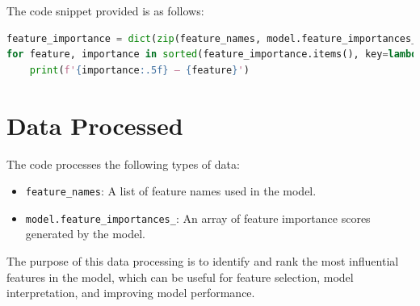\documentclass[12pt]{article}
\begin{document}
The code snippet provided is as follows:

\begin{lstlisting}[language=Python]
feature_importance = dict(zip(feature_names, model.feature_importances_))
for feature, importance in sorted(feature_importance.items(), key=lambda x: x[1], reverse=True):
    print(f'{importance:.5f} — {feature}')
\end{lstlisting}

\section*{Data Processed}

The code processes the following types of data:
\begin{itemize}
    \item \texttt{feature\_names}: A list of feature names used in the model.
    \item \texttt{model.feature\_importances\_}: An array of feature importance scores generated by the model.
\end{itemize}

The purpose of this data processing is to identify and rank the most influential features in the model, which can be useful for feature selection, model interpretation, and improving model performance.
\end{document}
